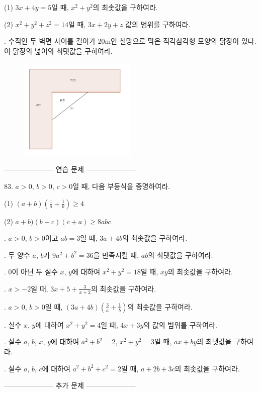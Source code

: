 \documentclass{article}
\begin{document}
\quad\:
(1) \(3x+4y=5\)일 때, \(x^2+y^2\)의 최솟값을 구하여라.

\quad\:
(2) \(x^2+y^2+z^2=14\)일 때, \(3x+2y+z\) 값의 범위를 구하여라.

. 수직인 두 벽면 사이를 길이가 20m인 철망으로 막은 직각삼각형 모양의 닭장이 있다. 이 닭장의 넓이의 최댓값을 구하여라.
\begin{figure}[h]
\centering
\includegraphics[width=0.5\textwidth]{34}
\end{figure}

--------------------- 연습 문제 ---------------------

83.
\(a>0\), \(b>0\), \(c>0\)일 때, 다음 부등식을 증명하여라.

\quad\:
(1) \((a+b)(\frac1a+\frac1b)\ge4\)

\quad\:
(2) \(a+b)(b+c)(c+a)\ge8abc\)

.
\(a>0\), \(b>0\)이고 \(ab=3\)일 때, \(3a+4b\)의 최솟값을 구하여라.

.
두 양수 \(a\), \(b\)가 \(9a^2+b^2=36\)을 만족시킬 때, \(ab\)의 최댓값을 구하여라.

.
0이 아닌 두 실수 \(x\), \(y\)에 대하여 \(x^2+y^2=18\)일 때, \(xy\)의 최솟값을 구하여라.

.
\(x>-2\)일 때, \(3x+5+\frac3{x+2}\)의 최솟값을 구하여라.

.
\(a>0\), \(b>0\)일 때, \((3a+4b)(\frac3a+\frac1b)\)의 최솟값을 구하여라.

.
실수 \(x\), \(y\)에 대하여 \(x^2+y^2=4\)일 때, \(4x+3y\)의 값의 범위를 구하여라.

.
실수 \(a\), \(b\), \(x\), \(y\)에 대하여 \(a^2+b^2=2\), \(x^2+y^2=3\)일 때, \(ax+by\)의 최댓값을 구하여라.

.
실수 \(a\), \(b\), \(c\)에 대하여 \(a^2+b^2+c^2=2\)일 때, \(a+2b+3c\)의 최솟값을 구하여라.

--------------------- 추가 문제 ---------------------
\end{document}

